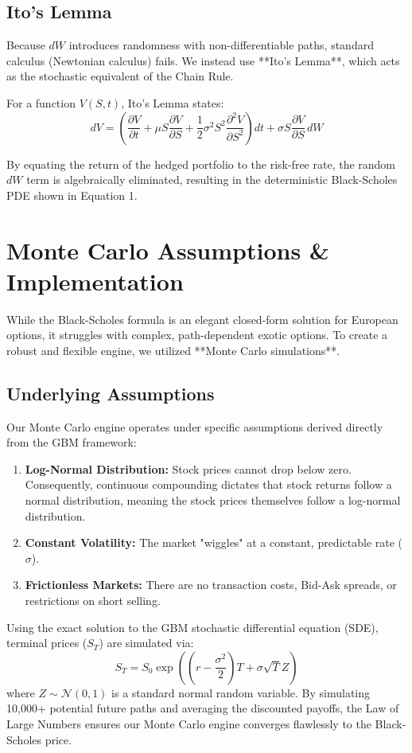 \documentclass[12pt, a4paper]{article}
\begin{document}
\subsection{Ito's Lemma}
Because $dW$ introduces randomness with non-differentiable paths, standard calculus (Newtonian calculus) fails. We instead use **Ito's Lemma**, which acts as the stochastic equivalent of the Chain Rule. 

For a function $V(S, t)$, Ito's Lemma states:
\begin{equation}
dV = \left( \frac{\partial V}{\partial t} + \mu S \frac{\partial V}{\partial S} + \frac{1}{2} \sigma^2 S^2 \frac{\partial^2 V}{\partial S^2} \right) dt + \sigma S \frac{\partial V}{\partial S} \, dW
\end{equation}

By equating the return of the hedged portfolio to the risk-free rate, the random $dW$ term is algebraically eliminated, resulting in the deterministic Black-Scholes PDE shown in Equation 1.

\section{Monte Carlo Assumptions \& Implementation}
While the Black-Scholes formula is an elegant closed-form solution for European options, it struggles with complex, path-dependent exotic options. To create a robust and flexible engine, we utilized **Monte Carlo simulations**.

\subsection{Underlying Assumptions}
Our Monte Carlo engine operates under specific assumptions derived directly from the GBM framework:
\begin{enumerate}
    \item \textbf{Log-Normal Distribution:} Stock prices cannot drop below zero. Consequently, continuous compounding dictates that stock returns follow a normal distribution, meaning the stock prices themselves follow a log-normal distribution.
    \item \textbf{Constant Volatility:} The market "wiggles" at a constant, predictable rate ($\sigma$).
    \item \textbf{Frictionless Markets:} There are no transaction costs, Bid-Ask spreads, or restrictions on short selling.
\end{enumerate}

Using the exact solution to the GBM stochastic differential equation (SDE), terminal prices ($S_T$) are simulated via:
\begin{equation}
S_T = S_0 \exp\left( \left( r - \frac{\sigma^2}{2} \right) T + \sigma \sqrt{T} Z \right)
\end{equation}
where $Z \sim \mathcal{N}(0, 1)$ is a standard normal random variable. By simulating 10,000+ potential future paths and averaging the discounted payoffs, the Law of Large Numbers ensures our Monte Carlo engine converges flawlessly to the Black-Scholes price.
\end{document}
